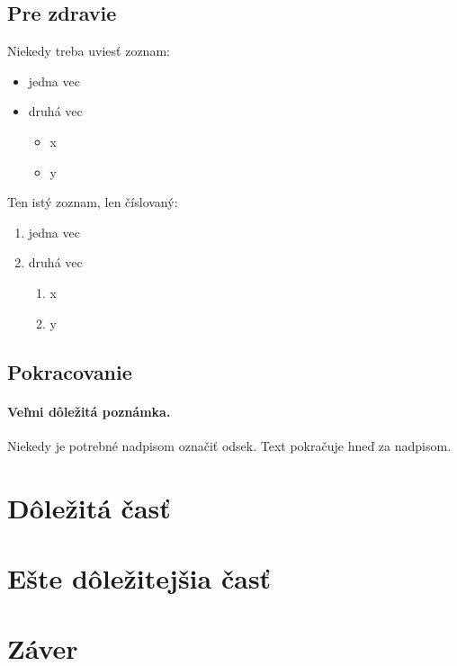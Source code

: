\documentclass[10pt,twoside,slovak,a4paper]{article}
\begin{document}
\subsection{Pre zdravie} \label{Pre zdravie}

Niekedy treba uviesť zoznam:

\begin{itemize}
\item jedna vec
\item druhá vec
	\begin{itemize}
	\item x
	\item y
	\end{itemize}
\end{itemize}

Ten istý zoznam, len číslovaný:

\begin{enumerate}
\item jedna vec
\item druhá vec
	\begin{enumerate}
	\item x
	\item y
	\end{enumerate}
\end{enumerate}


\subsection{Pokracovanie} \label{Pre zdravie}

\paragraph{Veľmi dôležitá poznámka.}
Niekedy je potrebné nadpisom označiť odsek. Text pokračuje hneď za nadpisom.



\section{Dôležitá časť} \label{dolezita}




\section{Ešte dôležitejšia časť} \label{dolezitejsia}




\section{Záver} \label{zaver} %






\end{document}
